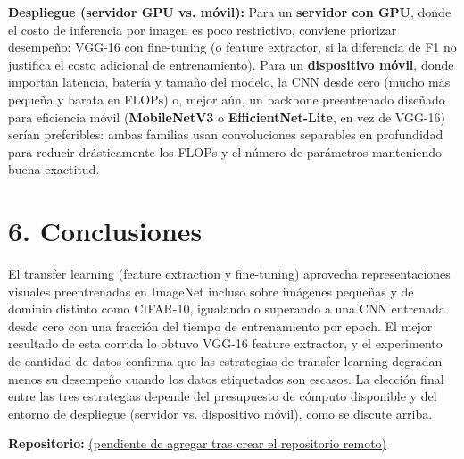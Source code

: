 \documentclass[9pt]{article}
\begin{document}
\textbf{Despliegue (servidor GPU vs. móvil):} Para un \textbf{servidor con GPU}, donde el costo de inferencia por imagen es poco restrictivo, conviene priorizar desempeño: VGG-16 con fine-tuning (o feature extractor, si la diferencia de F1 no justifica el costo adicional de entrenamiento). Para un \textbf{dispositivo móvil}, donde importan latencia, batería y tamaño del modelo, la CNN desde cero (mucho más pequeña y barata en FLOPs) o, mejor aún, un backbone preentrenado diseñado para eficiencia móvil (\textbf{MobileNetV3} o \textbf{EfficientNet-Lite}, en vez de VGG-16) serían preferibles: ambas familias usan convoluciones separables en profundidad para reducir drásticamente los FLOPs y el número de parámetros manteniendo buena exactitud.

\section*{6. Conclusiones}
\footnotesize
El transfer learning (feature extraction y fine-tuning) aprovecha representaciones visuales preentrenadas en ImageNet incluso sobre imágenes pequeñas y de dominio distinto como CIFAR-10, igualando o superando a una CNN entrenada desde cero con una fracción del tiempo de entrenamiento por epoch. El mejor resultado de esta corrida lo obtuvo VGG-16 feature extractor, y el experimento de cantidad de datos confirma que las estrategias de transfer learning degradan menos su desempeño cuando los datos etiquetados son escasos. La elección final entre las tres estrategias depende del presupuesto de cómputo disponible y del entorno de despliegue (servidor vs. dispositivo móvil), como se discute arriba.

\vspace{0.3em}
\noindent\footnotesize\textbf{Repositorio:} \url{(pendiente de agregar tras crear el repositorio remoto)}
\end{document}
